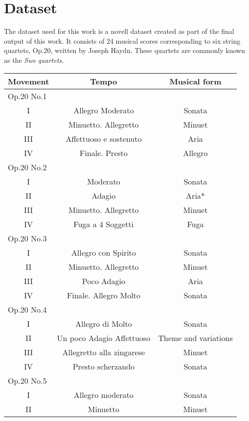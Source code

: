 \chapter{Dataset}
\label{chap:dataset}
The dataset used for this work is a novell dataset created as part of the final output of this work. It consists of 24 musical scores corresponding to six string quartets, Op.20, written by Joseph Haydn. These quartets are commonly known as the \emph{Sun quartets}.

\begin{table}[]
\centering
\begin{tabular}{|c|c|c|}
\hline
Movement & Tempo & Musical form \\ \hline
\multicolumn{3}{|l|}{Op.20 No.1} \\ \hline
I & Allegro Moderato & Sonata \\ \hline
II & Minuetto. Allegretto & Minuet \\ \hline
III & Affettuoso e sostenuto & Aria \\ \hline
IV & Finale. Presto & Allegro \\ \hline
\multicolumn{3}{|l|}{Op.20 No.2} \\ \hline
I & Moderato & Sonata \\ \hline
II & Adagio & Aria* \\ \hline
III & Minuetto. Allegretto & Minuet \\ \hline
IV & Fuga a 4 Soggetti & Fuga \\ \hline
\multicolumn{3}{|l|}{Op.20 No.3} \\ \hline
I & Allegro con Spirito & Sonata \\ \hline
II & Minuetto. Allegretto & Minuet \\ \hline
III & Poco Adagio & Aria \\ \hline
IV & Finale. Allegro Molto & Sonata \\ \hline
\multicolumn{3}{|l|}{Op.20 No.4} \\ \hline
I & Allegro di Molto & Sonata \\ \hline
II & Un poco Adagio Affettuoso & Theme and variations \\ \hline
III & Allegretto alla zingarese & Minuet \\ \hline
IV & Presto scherzando & Sonata \\ \hline
\multicolumn{3}{|l|}{Op.20 No.5} \\ \hline
I & Allegro moderato & Sonata \\ \hline
II & Minuetto & Minuet \\ \hline

\end{tabular}
\end{table}
